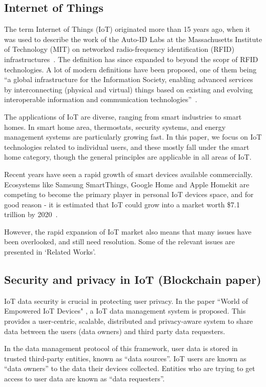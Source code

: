 \subsection{Internet of Things}
The term Internet of Things (IoT) originated more than 15 years ago, when it was used to describe the work of the Auto-ID Labs at the
Massachusetts Institute of Technology (MIT) on networked radio-frequency identification (RFID) infrastructures~\cite{atzori}. The definition has since expanded to beyond the scopr of RFID technologies. A lot of modern definitions have been proposed, one of them being ``a global infrastructure for the Information Society, enabling advanced services by interconnecting (physical and virtual) things based on existing and evolving interoperable information and communication technologies''~\cite{itu}.

The applications of IoT are diverse, ranging from smart industries to smart homes. In smart home area, thermostats, security systems, and energy management systems are particularly growing fast. In this paper, we focus on IoT technologies related to individual users, and these mostly fall under the smart home category, though the general principles are applicable in all areas of IoT.

Recent years have seen a rapid growth of smart devices available commercially. Ecosystems like Samsung SmartThings, Google Home and Apple Homekit are competing to become the primary player in personal IoT devices space, and for good reason -  it is estimated that IoT could grow into a market worth \$7.1 trillion by 2020~\cite{idc}.

However, the rapid expansion of IoT market also means that many issues have been overlooked, and still need resolution. Some of the relevant issues are presented in `Related Works'.

\subsection{Security and privacy in IoT (Blockchain paper)}
IoT data security is crucial in protecting user privacy. In the paper ``World of Empowered IoT Devices" \cite{campbell}, a IoT data management system is proposed. This provides a user-centric, scalable, distributed and privacy-aware system to share data between the users (data owners) and third party data requesters.

In the data management protocol of this framework, user data is stored in trusted third-party entities, known as “data sources”. IoT users are known as “data owners” to the data their devices collected. Entities who are trying to get access to user data are known as “data requesters”. 

